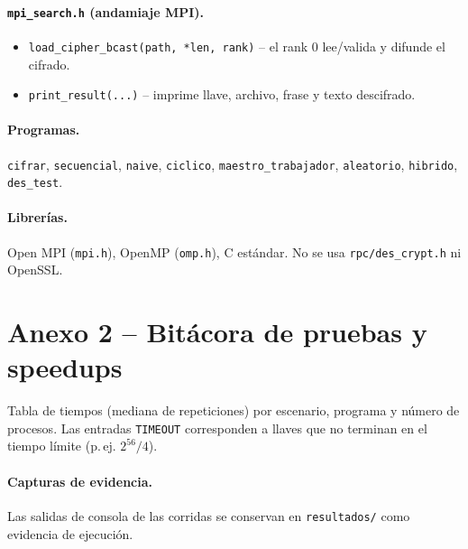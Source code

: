 \documentclass[11pt]{article}
\begin{document}
\paragraph{\texttt{mpi\_search.h} (andamiaje MPI).}
\begin{itemize}
  \item \texttt{load\_cipher\_bcast(path, *len, rank)} -- el rank 0 lee/valida y difunde el cifrado.
  \item \texttt{print\_result(...)} -- imprime llave, archivo, frase y texto descifrado.
\end{itemize}

\paragraph{Programas.} \texttt{cifrar}, \texttt{secuencial}, \texttt{naive}, \texttt{ciclico},
\texttt{maestro\_trabajador}, \texttt{aleatorio}, \texttt{hibrido}, \texttt{des\_test}.
\paragraph{Librerías.} Open MPI (\texttt{mpi.h}), OpenMP (\texttt{omp.h}), C estándar. No se usa
\texttt{rpc/des\_crypt.h} ni OpenSSL.

\section{Anexo 2 -- Bitácora de pruebas y speedups}
Tabla de tiempos (mediana de repeticiones) por escenario, programa y número de procesos. Las entradas
\texttt{TIMEOUT} corresponden a llaves que no terminan en el tiempo límite (p.\,ej. $2^{56}/4$).


\paragraph{Capturas de evidencia.} Las salidas de consola de las corridas se conservan en
\texttt{resultados/} como evidencia de ejecución.

\newpage


\end{document}

